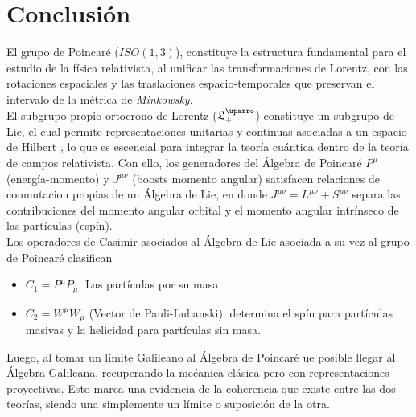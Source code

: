 \documentclass[12pt,letterpaper]{article}
\begin{document}
\section{Conclusión}
El grupo de Poincaré ($ISO(1,3)$), constituye la estructura fundamental para el estudio de la física relativista, al unificar las transformaciones de Lorentz, con las rotaciones espaciales y las traslaciones espacio-temporales que preservan el intervalo de la métrica de \emph{Minkowsky}. \\
El subgrupo propio ortocrono de Lorentz ($\mathfrak{L}^\uparro_+$) constituye un subgrupo de Lie, el cual permite representaciones unitarias y continuas asociadas a un espacio de Hilbert , lo que es escencial para integrar la teoría cuántica dentro de la teoría de campos relativista. Con ello, los generadores del Álgebra de Poincaré $P^\mu$ (energía-momento) y $J^{\mu\nu}$ (boosts momento angular) satisfacen relaciones de conmutacion propias de un Álgebra de Lie, en donde $J^{\mu\nu}=L^{\mu\nu} + S^{\mu\nu}$ separa las contribuciones del momento angular orbital y el momento angular intrínseco de las partículas (espín). \\
Los operadores de Casimir asociados al Álgebra de Lie asociada a su vez al grupo de Poincaré clasifican
\begin{itemize}
  \item $C_1=P^\mu P_\mu$: Las partículas por su masa
  \item $C_2=W^\mu W_\mu$  (Vector de Pauli-Lubanski): determina el spín para partículas masivas y la helicidad para partículas sin masa. 
\end{itemize}
Luego, al tomar un límite Galileano al Álgebra de Poincaré ue posible llegar al Álgebra Galileana, recuperando la mećanica clásica pero con representaciones proyectivas. Esto marca una evidencia de la coherencia que existe entre las dos teorías, siendo una simplemente un límite o suposición de la otra.
\newpage

\end{document}

